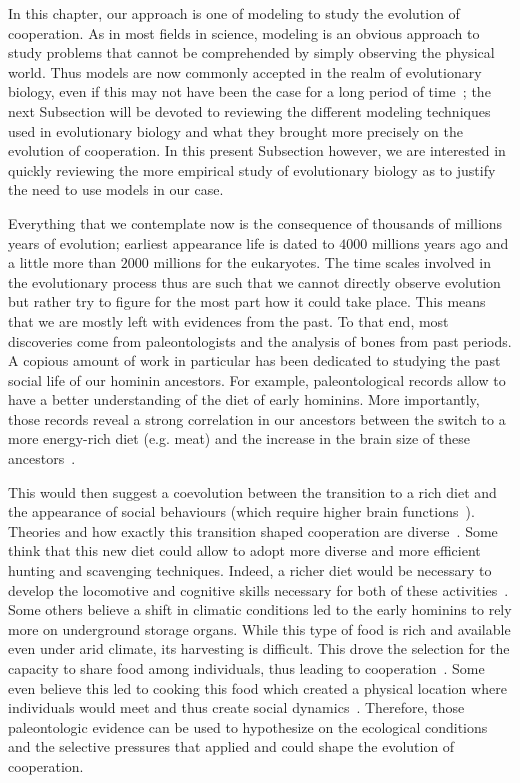     In this chapter, our approach is one of modeling to study the evolution of cooperation. As in most fields in science, modeling is an obvious approach to study problems that cannot be comprehended by simply observing the physical world. Thus models are now commonly accepted in the realm of evolutionary biology, even if this may not have been the case for a long period of time~\cite{Shou2015}; the next Subsection will be devoted to reviewing the different modeling techniques used in evolutionary biology and what they brought more precisely on the evolution of cooperation. In this present Subsection however, we are interested in quickly reviewing the more empirical study of evolutionary biology as to justify the need to use models in our case. 

    Everything that we contemplate now is the consequence of thousands of millions years of evolution; earliest appearance life is dated to $4000$ millions years ago and a little more than $2000$ millions for the eukaryotes. The time scales involved in the evolutionary process thus are such that we cannot directly observe evolution but rather try to figure for the most part how it could take place. This means that we are mostly left with evidences from the past. To that end, most discoveries come from paleontologists and the analysis of bones from past periods. A copious amount of work in particular has been dedicated to studying the past social life of our hominin ancestors. For example, paleontological records allow to have a better understanding of the diet of early hominins. More importantly, those records reveal a strong correlation in our ancestors between the switch to a more energy-rich diet (e.g. meat) and the increase in the brain size of these ancestors~\cite{Aiello1995, Wrangham1999}. 

    This would then suggest a coevolution between the transition to a rich diet and the appearance of social behaviours (which require higher brain functions~\cite{Dunbar2007, Isler2012}). Theories and how exactly this transition shaped cooperation are diverse~\cite{Pontze2012}. Some think that this new diet could allow to adopt more diverse and more efficient hunting and scavenging techniques. Indeed, a richer diet would be necessary to develop the locomotive and cognitive skills necessary for both of these activities~\cite{Aiello1995, Bramble2004}. Some others believe a shift in climatic conditions led to the early hominins to rely more on underground storage organs. While this type of food is rich and available even under arid climate, its harvesting is difficult. This drove the selection for the capacity to share food among individuals, thus leading to cooperation~\cite{O'Connell2002}. Some even believe this led to cooking this food which created a physical location where individuals would meet and thus create social dynamics~\cite{Wrangham1999, Wrangham2009}. Therefore, those paleontologic evidence can be used to hypothesize on the ecological conditions and the selective pressures that applied and could shape the evolution of cooperation.


